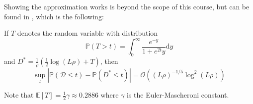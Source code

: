 \documentclass{article}
\begin{document}
Showing the approximation works is beyond the scope of this course, but can be found in \citep{Reinert2001}, which is the following:

\begin{theorem}
    If $T$ denotes the random variable with distribution
    \begin{equation*}
        \mathbb{P}(T>t) = \int_0^{\infty} \frac{e^{-y}}{1+e^{2t}y} \mathrm{d}y
    \end{equation*}
    and $D^* = \frac{1}{\rho} (\frac{1}{2}\log(L\rho) + T)$, then 
    \begin{equation*}
        \sup_t | \mathbb{P}(\mathcal{D} \leq t) - \mathbb{P}(D^* \leq t) | =\mathcal{O}((L\rho)^{-1/5} \log^2(L\rho))
    \end{equation*}
\end{theorem}

Note that $\mathbb{E}[T] = \frac{1}{2} \gamma \approx 0.2886$ where $\gamma$ is the Euler-Mascheroni constant.






\newpage


\end{document}
